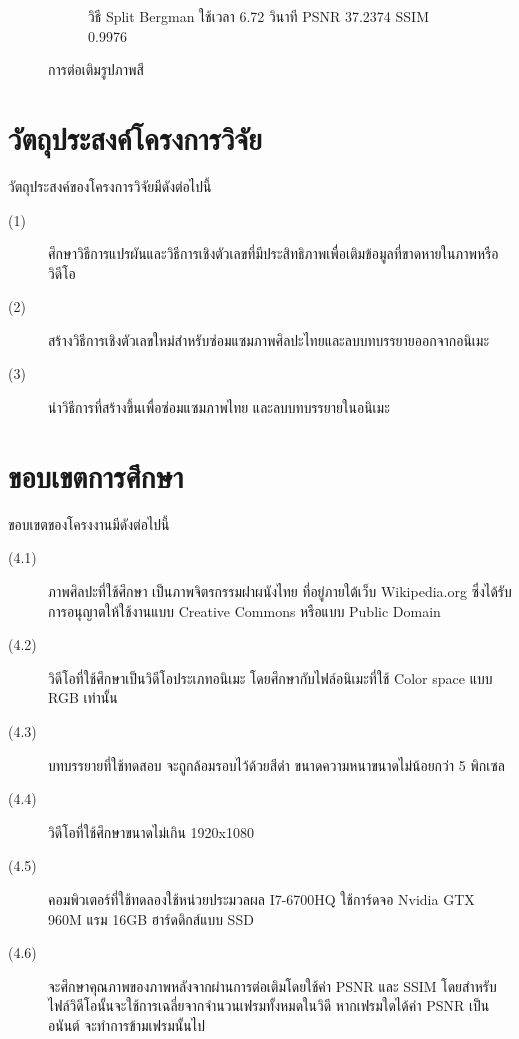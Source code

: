 \documentclass[hidelinks,a4paper,14pt]{article}
\numberwithin{equation}{section}							%
\begin{document}
{\begin{figure}[H]
\begin{subfigure}{0.4\linewidth}
		\caption{วิธี Split Bergman ใช้เวลา 6.72 วินาที PSNR 37.2374 SSIM 0.9976}
	\end{subfigure}
	\caption{การต่อเติมรูปภาพสี}
	\label{image:inpaint-color}
\end{figure}

\section{วัตถุประสงค์โครงการวิจัย}
วัตถุประสงค์ของโครงการวิจัยมีดังต่อไปนี้
\begin{description}
	\item[(1)]	 ศึกษาวิธีการแปรผันและวิธีการเชิงตัวเลขที่มีประสิทธิภาพเพื่อเติมข้อมูลที่ขาดหายในภาพหรือวิดีโอ
	\item[(2)] สร้างวิธีการเชิงตัวเลขใหม่สำหรับซ่อมแซมภาพศิลปะไทยและลบบทบรรยายออกจากอนิเมะ
	\item[(3)] นำวิธีการที่สร้างขึ้นเพื่อซ่อมแซมภาพไทย และลบบทบรรยายในอนิเมะ
\end{description}



\section{ขอบเขตการศึกษา}

ขอบเขตของโครงงานมีดังต่อไปนี้
\begin{description}
	\item[(4.1)] ภาพศิลปะที่ใช้ศึกษา เป็นภาพจิตรกรรมฝาผนังไทย ที่อยู่ภายใต้เว็บ Wikipedia.org ซึ่งได้รับการอนุญาตให้ใช้งานแบบ Creative Commons หรือแบบ Public Domain
	\item[(4.2)] วิดีโอที่ใช้ศึกษาเป็นวิดีโอประเภทอนิเมะ โดยศึกษากับไฟล์อนิเมะที่ใช้ Color space แบบ RGB เท่านั้น
	\item[(4.3)] บทบรรยายที่ใช้ทดสอบ จะถูกล้อมรอบไว้ด้วยสีดำ ขนาดความหนาขนาดไม่น้อยกว่า 5 พิกเซล
	\item[(4.4)] วิดีโอที่ใช้ศึกษาขนาดไม่เกิน 1920x1080
	\item[(4.5)] คอมพิวเตอร์ที่ใช้ทดลองใช้หน่วยประมวลผล I7-6700HQ ใช้การ์ดจอ Nvidia GTX 960M แรม 16GB ฮาร์ดดิกส์แบบ SSD
	\item[(4.6)] จะศึกษาคุณภาพของภาพหลังจากผ่านการต่อเติมโดยใช้ค่า PSNR และ SSIM โดยสำหรับไฟล์วิดีโอนั้นจะใช้การเฉลี่ยจากจำนวนเฟรมทั้งหมดในวิดี หากเฟรมใดได้ค่า PSNR เป็นอนันต์ จะทำการข้ามเฟรมนั้นไป
\end{description}

}
\end{document}
